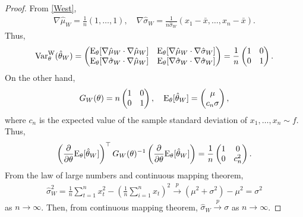 \documentclass[11pt, a4paper]{article}
\begin{document}
\begin{proof}
	From \eqref{West},
	\begin{align*}
		\nabla \hat{\mu}_W = \frac{1}{n} \left( 1,\dots,1 \right),\quad \nabla \hat{\sigma}_W = \frac{1}{n\hat{\sigma}_W} ( x_1-\bar{x},\dots, x_n-\bar{x} ).
	\end{align*}
	Thus,
	\begin{align*}
		{\rm Var}_{\theta}^{\mathrm{W}} (\hat{\theta}_W)= \begin{pmatrix} {\rm E}_{\theta} [\nabla \hat{\mu}_W \cdot \nabla \hat{\mu}_W] & {\rm E}_{\theta} [\nabla \hat{\mu}_W \cdot \nabla \hat{\sigma}_W] \\ {\rm E}_{\theta} [\nabla \hat{\sigma}_W \cdot \nabla \hat{\mu}_W] & {\rm E}_{\theta} [\nabla \hat{\sigma}_W \cdot \nabla \hat{\sigma}_W] \end{pmatrix} = \frac{1}{n}\begin{pmatrix}
			1 & 0 \\
			0 & 1
		\end{pmatrix}.
	\end{align*}
	On the other hand, 
	\begin{align*}
		G_W(\theta)= n \begin{pmatrix}
			1 & 0 \\
			0 & 1
		\end{pmatrix}, \quad {\rm E}_{\theta}[\hat{\theta}_W]= \begin{pmatrix} \mu \\ c_n \sigma \end{pmatrix},
	\end{align*}
	where $c_n$ is the expected value of the sample standard deviation of $x_1,\dots,x_n \sim f$.
	Thus,
	\begin{align*}
		\left(\frac{\partial}{\partial \theta} {\rm E}_{\theta}[\hat{\theta}_W]\right)^\top G_W(\theta)^{-1} \left(\frac{\partial}{\partial \theta} {\rm E}_{\theta}[\hat{\theta}_W]\right) = \frac{1}{n}\begin{pmatrix}
			1 & 0 \\
			0 & c_n^2
		\end{pmatrix}.
	\end{align*}
	From the law of large numbers and continuous mapping theorem, 
	\begin{align*}
		\hat{\sigma}_W^2 = \frac{1}{n} \sum_{t=1}^n x_t^2 - \left( \frac{1}{n} \sum_{i=1}^n x_t \right)^2 \overset{p}{\to} (\mu^2+\sigma^2) - \mu^2 = \sigma^2
	\end{align*}
	as $n \to \infty$.
	Then, from continuous mapping theorem, $\hat{\sigma}_W \overset{p}{\to} \sigma$ as $n\to\infty$.

\end{proof}
\end{document}
